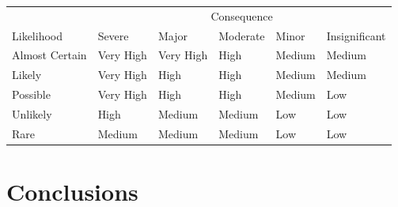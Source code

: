 \documentclass[]{report}
\begin{document}
\begin{table}[h]
	\begin{tabular}{|l|lllll}
		\hline
		& \multicolumn{5}{c|}{Consequence}                                                                                                                                                                                                                           \\ \cline{2-6}
		\multirow{-2}{*}{Likelihood} & \multicolumn{1}{l|}{\cellcolor[HTML]{FFFFFF}Severe} & \multicolumn{1}{l|}{\cellcolor[HTML]{FFFFFF}Major} & \multicolumn{1}{l|}{\cellcolor[HTML]{FFFFFF}Moderate} & \multicolumn{1}{l|}{\cellcolor[HTML]{FFFFFF}Minor} & \multicolumn{1}{l|}{Insignificant} \\ \hline
		Almost Certain               & \cellcolor[HTML]{FE0000}Very High                   & \cellcolor[HTML]{FE0000}Very High                  & \cellcolor[HTML]{F56B00}High                          & \cellcolor[HTML]{F8FF00}Medium                     & \cellcolor[HTML]{F8FF00}Medium     \\ \cline{1-1}
		Likely                       & \cellcolor[HTML]{FE0000}Very High                   & \cellcolor[HTML]{F56B00}High                       & \cellcolor[HTML]{F56B00}High                          & \cellcolor[HTML]{F8FF00}Medium                     & \cellcolor[HTML]{F8FF00}Medium     \\ \cline{1-1}
		Possible                     & \cellcolor[HTML]{FE0000}Very High                   & \cellcolor[HTML]{F56B00}High                       & \cellcolor[HTML]{F56B00}High                          & \cellcolor[HTML]{FCFF2F}Medium                     & \cellcolor[HTML]{32CB00}Low        \\ \cline{1-1}
		Unlikely                     & \cellcolor[HTML]{F56B00}High                        & \cellcolor[HTML]{F8FF00}Medium                     & \cellcolor[HTML]{F8FF00}Medium                        & \cellcolor[HTML]{32CB00}Low                        & \cellcolor[HTML]{32CB00}Low        \\ \cline{1-1}
		Rare                         & \cellcolor[HTML]{F8FF00}Medium                      & \cellcolor[HTML]{F8FF00}Medium                     & \cellcolor[HTML]{F8FF00}Medium                        & \cellcolor[HTML]{32CB00}Low                        & \cellcolor[HTML]{32CB00}Low        \\ \cline{1-1}
	\end{tabular}
	\label{RiskMatrixTable}
\end{table}

\chapter{Conclusions}
\end{document}
